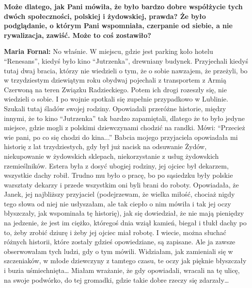 \textbf{Może dlatego, jak Pani mówiła, że było bardzo dobre współżycie tych dwóch społeczności, polskiej i żydowskiej, prawda? Że było podglądanie, o którym Pani wspomniała, czerpanie od siebie, a nie rywalizacja, zawiść. Może to coś zostawiło?}

\textbf{Maria Fornal:} No właśnie. W miejscu, gdzie jest parking koło hotelu "`Renesans"', kiedyś było kino "`Jutrzenka"', drewniany budynek. Przyjechali kiedyś tutaj dwaj bracia, którzy nie wiedzieli o tym, że o sobie nawzajem, że przeżyli, bo w trzydziestym dziewiątym roku obydwaj pojechali z transportem z Armią Czerwoną na teren Związku Radzieckiego. Potem ich drogi rozeszły się, nie wiedzieli o sobie. I po wojnie spotkali się zupełnie przypadkowo w Lublinie. Szukali tutaj śladów swojej rodziny. Opowiadali przeróżne historie, między innymi, że to kino "`Jutrzenka"' tak bardzo zapamiętali, dlatego że to było jedyne miejsce, gdzie mogli z polskimi dziewczynami chodzić na randki. Mówi: "`Przecież wie pani, po co się chodzi do kina..."' Babcia mojego przyjaciela opowiadała mi historię z lat trzydziestych, gdy był już nacisk na odsuwanie Żydów, niekupowanie w żydowskich sklepach, niekorzystanie z usług żydowskich rzemieślników. Estera była z dosyć ubogiej rodziny, jej ojciec był dekarzem, wszystkie dachy robił. Trudno mu było o pracę, bo po sąsiedzku były polskie warsztaty dekarzy i przede wszystkim oni byli brani do roboty. Opowiadała, że Janek, jej najbliższy przyjaciel (podejrzewam, że wielka miłość, chociaż nigdy tego słowa od niej nie usłyszałam, ale tak ciepło o nim mówiła i tak jej oczy błyszczały, jak wspominała tę historię), jak się dowiedział, że nie mają pieniędzy na jedzenie, że jest im ciężko, któregoś dnia wziął kamień, biegał i tłukł dachy po to, żeby zrobić dziurę i żeby jej ojciec miał robotę. I wiecie, można słuchać różnych historii, które zostały gdzieś opowiedziane, są zapisane. Ale ja zawsze obserwowałam tych ludzi, gdy o tym mówili. Widziałam, jak zamieniali się w szczeniaków, w młode dziewczyny z tamtego czasu, te oczy jak pięknie błyszczały i buzia uśmiechnięta… Miałam wrażanie, że gdy opowiadali, wracali na tę ulicę, na swoje podwórko, do tej gromadki, gdzie takie dobre rzeczy się zdarzały… 
	
   

 

 